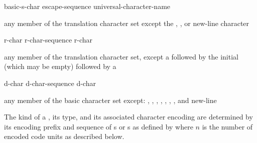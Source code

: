 \begin{bnf}
\br
    basic-s-char\br
    escape-sequence\br
    universal-character-name
\end{bnf}

\begin{bnf}
\br
    \textnormal{any member of the translation character set except the ,}\br
    \bnfindent\textnormal{, or new-line character}
\end{bnf}

\begin{bnf}
\br
      \literalterminal{(}  \literalterminal{)}  
\end{bnf}

\begin{bnf}
\br
    r-char\br
    r-char-sequence r-char
\end{bnf}

\begin{bnf}
\br
    \textnormal{any member of the translation character set, except a  followed by}\br
    \bnfindent\textnormal{the initial  (which may be empty) followed by a }
\end{bnf}

\begin{bnf}
\br
    d-char\br
    d-char-sequence d-char
\end{bnf}

\begin{bnf}
\br
    \textnormal{any member of the basic character set except:}\br
    \bnfindent\textnormal{, , , ,}\br
    \bnfindent\textnormal{, , , and new-line}
\end{bnf}

\pnum
{}%
%
%
%
%
%
%
%
%
The kind of a ,
its type, and
its associated character encoding
are determined by its encoding prefix and sequence of
s or s
as defined by 
where $n$ is the number of encoded code units as described below.

